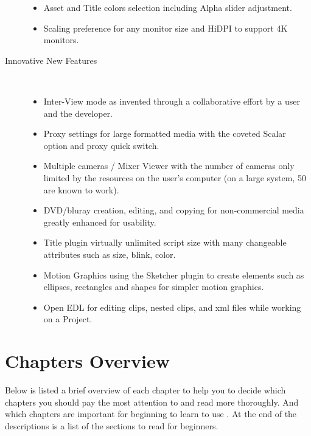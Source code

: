 \begin{description}
\begin{itemize}
                \item Asset and Title colors selection including Alpha slider adjustment.
                \item Scaling preference for any monitor size and HiDPI to support 4K monitors.
            \end{itemize}
            \item[Innovative New Features]~\\
                \begin{itemize}
                    \item Inter-View mode as invented through a collaborative effort by a user and the developer.
                    \item Proxy settings for large formatted media with the coveted Scalar option and proxy quick switch.
                    \item Multiple cameras / Mixer Viewer with the number of cameras only limited by the resources on the user’s computer (on a large system, 50 are known to work).
                    \item DVD/bluray creation, editing, and copying for non-commercial media greatly enhanced for usability.
                    \item Title plugin virtually unlimited script size with many changeable attributes such as size, blink, color.
                    \item Motion Graphics using the Sketcher plugin to create elements such as ellipses, rectangles and shapes for simpler motion graphics.
                    \item Open EDL for editing clips, nested clips, and xml files while working on a Project.
                \end{itemize}
\end{description}

\section*{Chapters Overview}%
\label{sec:chapters_overview}

Below is listed a brief overview of each chapter to help you to decide which chapters you should pay the most attention to and read more thoroughly.
And which chapters are important for beginning to learn to use \CGG{}. At the end of the descriptions is a list of the sections to read for beginners.


